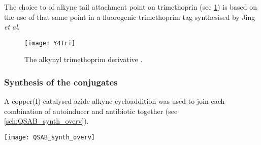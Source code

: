 The choice to of alkyne tail attachment point on trimethoprin  (see \ref{fgr:Y4Tri}) is based on the use of that same point in a fluorogenic trimethoprim tag synthesised by Jing \textit{et al}\cite{Jing2013}.

\begin{figure}[H]
	\begin{center}
		\texttt{[image: Y4Tri]}
		\caption{The alkynyl trimethoprim derivative . \label{fgr:Y4Tri}}
	\end{center}
\end{figure}

\subsubsection{Synthesis of the conjugates}

A copper(I)-catalysed azide-alkyne cycloaddition\cite{Tornoe2002,Rostovtsev2002} was used to join each combination of autoinducer and antibiotic together (see \ref{sch:QSAB_synth_overv}). 

\begin{scheme}[H]
	\begin{center}
		\texttt{[image: QSAB\_synth\_overv]}
		\caption{The construction of the triazole-linked autoinducer-antibiotic conjugate library using a copper(I)-catalysed azide-alkyne cycloaddition. \label{sch:QSAB_synth_overv}}
	\end{center}
\end{scheme}
